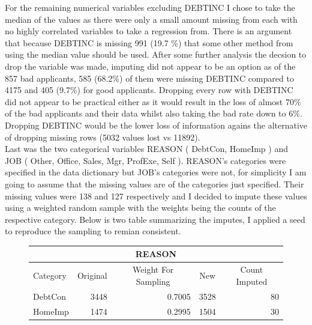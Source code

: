 For the remaining numerical variables excluding DEBTINC I chose to take the median of the values as there were only a small amount missing from each with no highly correlated variables to take a regression from. There is an argument that because DEBTINC is missing 991 (19.7 \%) that some other method from using the median value should be used. After some further analysis the decsion to drop the variable was made,  imputing did not appear to be an option as of the 857 bad applicants,  585 (68.2\%) of them were missing DEBTINC compared to 4175 and 405 (9.7\%) for good applicants. Dropping every row with DEBTINC did not appear to be practical either as it would result in the loss of almost 70\% of the bad applicants and their data whilst also taking the bad rate down to 6\%. Dropping DEBTINC would be the lower loss of information agains the alternative of dropping missing rows (5032 values lost vs 11892). \\

Last was the two categorical variables REASON ( DebtCon,  HomeImp ) and JOB ( Other,  Office,  Sales,  Mgr,  ProfExe,  Self ). REASON's categories were specified in the data dictionary but JOB's categories were not,  for simplicity I am going to assume that the missing values are of the categories just specified. Their missing values were 138 and 127 respectively and I decided to impute these values using a weighted random sample with the weights being the counts of the respective category. Below is two table summarizing the imputes,  I applied a seed to reproduce the sampling to remian consistent. \\

\begin{figure}[ht]\label{REASON_IMPUTES}
	\centering
	\renewcommand{\arraystretch}{1.25}
	\begin{tabular}{lrrrr}
	\multicolumn{5}{c}{REASON}\\
	\hline
	Category & \multicolumn{1}{c}{Original} & \multicolumn{1}{c}{Weight For Sampling} & \multicolumn{1}{c}{New} & \multicolumn{1}{c}{Count Imputed} \\ 
	\hline
	DebtCon & 3448 & 0.7005 & 3528 & 80\\
	HomeImp & 1474 & 0.2995 & 1504  & 30\\
	\end{tabular}
\end{figure}

